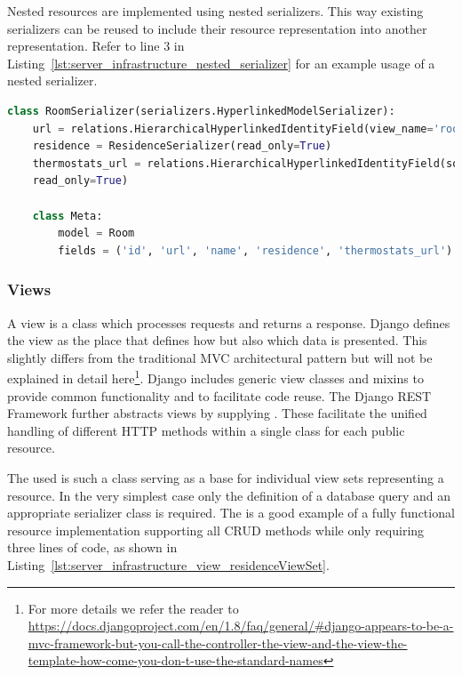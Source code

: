 Nested resources are implemented using nested serializers.
This way existing serializers can be reused to include their resource representation into another representation. Refer to line 3 in Listing~\ref{lst:server_infrastructure_nested_serializer} for an example usage of a nested serializer.

\begin{lstlisting}[label={lst:server_infrastructure_nested_serializer},language={Python},
caption={The \highlight{RoomSerializer} class as an example of the usage of the \highlight{Hierarchical\allowbreak Hyperlinked\allowbreak IdentityField} and nested serializers.
}]
class RoomSerializer(serializers.HyperlinkedModelSerializer):
	url = relations.HierarchicalHyperlinkedIdentityField(view_name='room-detail', read_only=True)
	residence = ResidenceSerializer(read_only=True)
	thermostats_url = relations.HierarchicalHyperlinkedIdentityField(source='thermostats', view_name='thermostat-list',
	read_only=True)
	
	class Meta:
		model = Room
		fields = ('id', 'url', 'name', 'residence', 'thermostats_url')
\end{lstlisting}

\subsubsection{Views}
\label{sec:server_infrastructure_views}

A view is a class which processes requests and returns a response.
Django defines the view as the place that defines how but also which data is presented.
This slightly differs from the traditional MVC architectural pattern but will not be explained in detail here\footnote{For more details we refer the reader to \url{https://docs.djangoproject.com/en/1.8/faq/general/\#django-appears-to-be-a-mvc-framework-but-you-call-the-controller-the-view-and-the-view-the-template-how-come-you-don-t-use-the-standard-names}}.
Django includes generic view classes and mixins to provide common functionality and to facilitate code reuse.
The Django REST Framework further abstracts views by supplying .
These  facilitate the unified handling of different HTTP methods within a single class for each public resource.

The used  is such a class serving as a base for individual view sets representing a resource.
In the very simplest case only the definition of a database query and an appropriate serializer class is required.
The  is a good example of a fully functional resource implementation supporting all CRUD methods while only requiring three lines of code, as shown in Listing~\ref{lst:server_infrastructure_view_residenceViewSet}.

